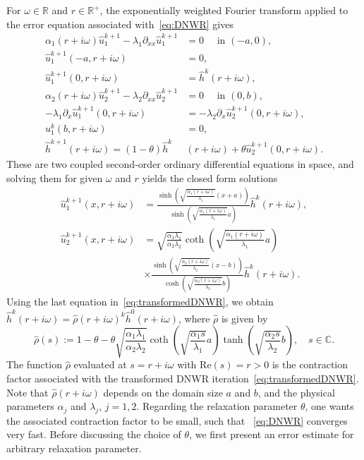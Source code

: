 \documentclass[10pt,a4paper]{amsart}
\begin{document}
For $\omega\in\mathbb{R}$ and $r\in\mathbb{R}^+$, the exponentially weighted Fourier transform applied to the error equation associated with~\eqref{eq:DNWR} gives
\begin{equation}\label{eq:transformedDNWR}
\begin{aligned}
	\alpha_1 (r+i \omega) \hat{u}_1^{k+1} -\lambda_1 \partial_{xx} \hat{u}_1^{k+1} &= 0 \quad \text{ in } (-a,0),\\
	\hat{u}_1^{k+1}(-a, r+i \omega) &= 0,\\
	\hat{u}_1^{k+1}(0, r+i\omega) &= \hat h^{k}(r+i \omega),\\
	\alpha_2 (r+i \omega) \hat{u}_2^{k+1} -\lambda_2 \partial_{xx} \hat{u}_2^{k+1} &= 0 \quad \text{ in } (0,b),\\
	-\lambda_1 \partial_x \hat{u}_1^{k+1}(0, r+i \omega) &= -\lambda_2 \partial_x \hat{u}_2^{k+1}(0, r+i \omega),\\
	u_1^k(b, r+i \omega) &= 0, \\
	\hat{h}^{k+1}(r+i\omega) = (1-\theta) \hat{h}^k&(r+i\omega) + \theta \hat{u}^{k+1}_2(0, r+i \omega).
\end{aligned}
\end{equation}
These are two coupled second-order ordinary differential equations in space, and solving them for given $\omega$ and $r$ yields the closed form solutions
\[\begin{aligned}
	\hat{u}_1^{k+1}(x, r+i \omega) &= \frac{\sinh\left( \sqrt{\frac{\alpha_1 (r+i \omega)}{\lambda_1}} (x +a) \right)}{\sinh\left( \sqrt{\frac{\alpha_1 (r+i \omega)}{\lambda_1}} a \right)} \hat{h}^k(r+i \omega), \\
	\hat{u}_2^{k+1}(x, r+i \omega) &= 
	\sqrt{\frac{\alpha_1 \lambda_1}{\alpha_2 \lambda_2}}  \coth\left( \sqrt{\frac{\alpha_1 (r+i \omega)}{\lambda_1}} a\right) \\
	&\times \frac{\sinh\left( \sqrt{\frac{\alpha_2 (r+i \omega)}{\lambda_2}} (x - b) \right)}{\cosh\left( \sqrt{\frac{\alpha_2 (r+i \omega)}{\lambda_2}} b \right)} \hat{h}^k(r+i \omega).
\end{aligned}\]
Using the last equation in~\eqref{eq:transformedDNWR}, we obtain $\hat{h}^k(r+i \omega) = \hat{\rho}(r+i \omega)^k \hat{h}^0(r+i \omega)$, where $\hat{\rho}$ is given by
\begin{equation}\label{eq:cvfCont}
\hat{\rho}(s) := 1 - \theta - \theta \sqrt{\frac{\alpha_1 \lambda_1}{\alpha_2 \lambda_2}}\coth\left(\sqrt{\frac{\alpha_1 s}{\lambda_1}} a\right) \tanh\left(\sqrt{\frac{\alpha_2 s}{\lambda_2}} b\right), \quad s\in\mathbb{C}.
\end{equation}
The function $\hat{\rho}$ evaluated at $s=r+i\omega$ with $\text{Re}(s) = r>0$ is the contraction factor associated with the transformed DNWR iteration~\eqref{eq:transformedDNWR}. Note that $ \hat{\rho}(r+i \omega)$ depends on the domain size $a$ and $b$, and the physical parameters $\alpha_j$ and $\lambda_j$, $j=1, 2$. 
Regarding the relaxation parameter $\theta$, one wants the associated contraction factor to be small, such that ~\eqref{eq:DNWR} converges very fast. Before discussing the choice of $\theta$, we first present an error estimate for arbitrary relaxation parameter.
\end{document}
